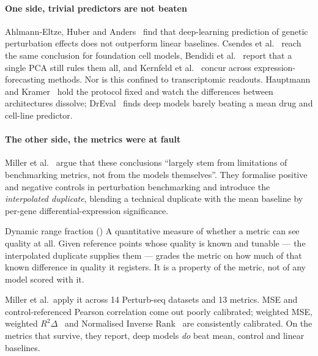 \paragraph{One side, trivial predictors are not beaten}
Ahlmann-Eltze, Huber and Anders~\cite{ahlmanneltze} find that deep-learning
prediction of genetic perturbation effects does not outperform linear baselines.
Csendes et al.~\cite{csendes} reach the same conclusion for foundation cell
models, Bendidi et al.~\cite{bendidi} report that a single PCA still rules them
all, and Kernfeld et al.~\cite{kernfeld} concur across expression-forecasting
methods. Nor is this confined to transcriptomic readouts. Hauptmann and
Kramer~\cite{hauptmann} hold the protocol fixed and watch the differences between
architectures dissolve; DrEval~\cite{dreval} finds deep models barely beating a
mean drug and cell-line predictor.

\paragraph{The other side, the metrics were at fault} Miller et
al.~\cite{miller} argue that these conclusions ``largely stem from limitations of
benchmarking metrics, not from the models themselves''. They formalise positive
and negative controls in perturbation benchmarking and introduce the
\emph{interpolated duplicate}, blending a technical duplicate with the mean
baseline by per-gene differential-expression
significance.

\begin{defn}{Dynamic range fraction (\DRF)}
A quantitative measure of whether a metric can see quality at all. Given
reference points whose quality is known and tunable --- the interpolated
duplicate supplies them --- \DRF{} grades the metric on how much of that known
difference in quality it registers. It is a property of the metric, not of any
model scored with it.
\end{defn}

Miller et al.\ apply it across 14 Perturb-seq datasets and 13 metrics. MSE and
control-referenced Pearson correlation come out poorly calibrated; weighted MSE,
weighted $R^2\Delta$~\cite{mejia} and Normalised Inverse
Rank~\cite{perturbench} are consistently calibrated. On the metrics that survive,
they report, deep models \emph{do} beat mean, control and linear baselines.

